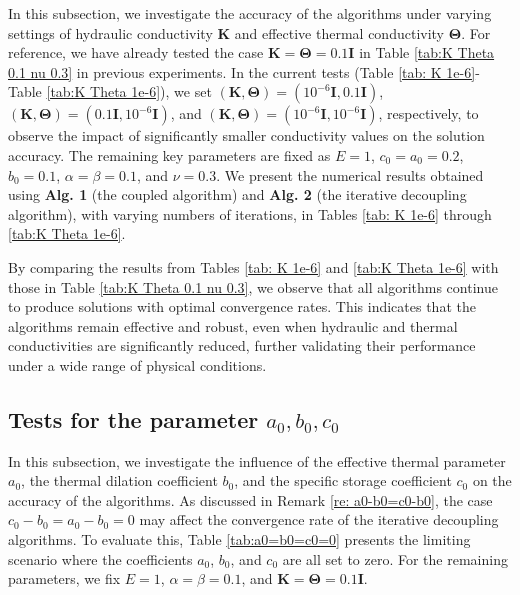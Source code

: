 \documentclass{article}
\numberwithin{equation}{section}
\begin{document}
In this subsection, we investigate the accuracy of the algorithms under varying settings of hydraulic conductivity \(\bm K\) and effective thermal conductivity \(\bm \Theta\). For reference, we have already tested the case \(\bm K = \bm \Theta = 0.1 \bm I\) in Table \ref{tab:K Theta 0.1 nu 0.3} in previous experiments. In the current tests (Table \ref{tab: K 1e-6}-Table \ref{tab:K Theta 1e-6}), we set \((\bm K, \bm\Theta) =(10^{-6}\bm I,0.1\bm I)\), \((\bm K, \bm\Theta) =(0.1\bm I, 10^{-6}\bm I)\), and \((\bm K, \bm\Theta) =(10^{-6}\bm I, 10^{-6}\bm I)\), respectively, to observe the impact of significantly smaller conductivity values on the solution accuracy.
The remaining key parameters are fixed as \(E = 1\), \(c_0 = a_0 = 0.2\), \(b_0 = 0.1\),  \(\alpha = \beta = 0.1\), and \(\nu=0.3\). We present the numerical results obtained using \textbf{Alg. 1} (the coupled algorithm) and \textbf{Alg. 2} (the iterative decoupling algorithm), with varying numbers of iterations, in Tables \ref{tab: K 1e-6} through \ref{tab:K Theta 1e-6}.

By comparing the results from Tables \ref{tab: K 1e-6} and \ref{tab:K Theta 1e-6} with those in Table \ref{tab:K Theta 0.1 nu 0.3}, we observe that all algorithms continue to produce solutions with optimal convergence rates. This indicates that the algorithms remain effective and robust, even when hydraulic and thermal conductivities are significantly reduced, further validating their performance under a wide range of physical conditions. 

\subsection{ Tests for the parameter $a_0,b_0,c_0$}
In this subsection, we investigate the influence of the effective thermal parameter \(a_0\), the thermal dilation coefficient \(b_0\), and the specific storage coefficient \(c_0\) on the accuracy of the algorithms. As discussed in Remark \ref{re: a0-b0=c0-b0}, the case \(c_0 - b_0 = a_0 - b_0 = 0\) may affect the convergence rate of the iterative decoupling algorithms. To evaluate this, Table \ref{tab:a0=b0=c0=0} presents the limiting scenario where the coefficients \(a_0\), \(b_0\), and \(c_0\) are all set to zero. For the remaining parameters, we fix \(E = 1\), \(\alpha = \beta = 0.1\), and \(\bm{K} = \bm{\Theta} = 0.1\bm{I}\). 
\end{document}
